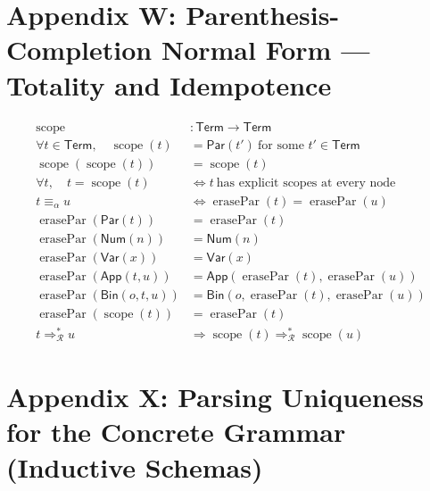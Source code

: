 \documentclass[11pt,oneside]{article}
\begin{document}
\section{Appendix W: Parenthesis-Completion Normal Form --- Totality and Idempotence}

\begin{align}
\operatorname{scope} &: \mathsf{Term}\to \mathsf{Term} \\[10pt]

\forall t\in \mathsf{Term},\quad
\operatorname{scope}(t)
&=
\mathsf{Par}(t')\ \text{for some }t'\in\mathsf{Term}
\\[14pt]

\operatorname{scope}(\operatorname{scope}(t))
&=
\operatorname{scope}(t)
\\[14pt]

\forall t,\quad t=\operatorname{scope}(t)
&\Longleftrightarrow
t\ \text{has explicit scopes at every node}
\\[16pt]

t \equiv_{\alpha} u
&\Longleftrightarrow
\operatorname{erasePar}(t)=\operatorname{erasePar}(u)
\\[12pt]

\operatorname{erasePar}(\mathsf{Par}(t)) &= \operatorname{erasePar}(t) \\[4pt]
\operatorname{erasePar}(\mathsf{Num}(n)) &= \mathsf{Num}(n) \\[4pt]
\operatorname{erasePar}(\mathsf{Var}(x)) &= \mathsf{Var}(x) \\[4pt]
\operatorname{erasePar}(\mathsf{App}(t,u)) &= \mathsf{App}(\operatorname{erasePar}(t),\operatorname{erasePar}(u)) \\[4pt]
\operatorname{erasePar}(\mathsf{Bin}(o,t,u)) &= \mathsf{Bin}(o,\operatorname{erasePar}(t),\operatorname{erasePar}(u))
\\[14pt]

\operatorname{erasePar}(\operatorname{scope}(t))
&=
\operatorname{erasePar}(t)
\\[14pt]

t \Rightarrow_{\mathcal{R}}^{\ast} u
&\Longrightarrow
\operatorname{scope}(t)\Rightarrow_{\mathcal{R}}^{\ast}\operatorname{scope}(u)
\end{align}

\section{Appendix X: Parsing Uniqueness for the Concrete Grammar (Inductive Schemas)}
\end{document}
